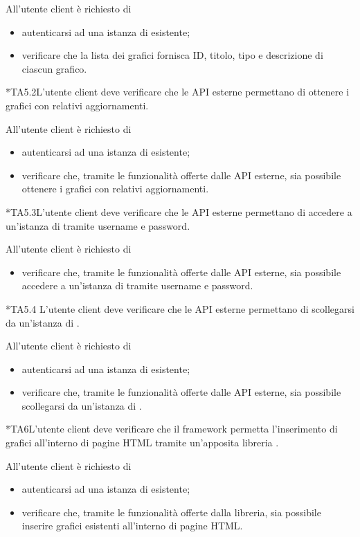 		All'utente client è richiesto di
		\begin{itemize}
			\item autenticarsi ad una istanza di \projectname{} esistente;
			\item verificare che la lista dei grafici fornisca ID, titolo, tipo e descrizione di ciascun grafico.
		\end{itemize}

	*{TA5.2}L'utente client deve verificare che le API esterne permettano di ottenere i grafici con relativi aggiornamenti.
		
		All'utente client è richiesto di
		\begin{itemize}
			\item autenticarsi ad una istanza di \projectname{} esistente;
			\item verificare che, tramite le funzionalità offerte dalle API esterne, sia possibile ottenere i grafici con relativi aggiornamenti.
		\end{itemize}

	*{TA5.3}L'utente client deve verificare che le API esterne permettano di accedere a un'istanza di \projectname{} tramite username e password.
		
		All'utente client è richiesto di
		\begin{itemize}
			\item verificare che, tramite le funzionalità offerte dalle API esterne, sia possibile accedere a un'istanza di \projectname{} tramite username e password.
		\end{itemize}

	*{TA5.4} L'utente client deve verificare che le API esterne permettano di scollegarsi  da un'istanza di \projectname{}.
		
		All'utente client è richiesto di
		\begin{itemize}
			\item autenticarsi ad una istanza di \projectname{} esistente;
			\item verificare che, tramite le funzionalità offerte dalle API esterne, sia possibile scollegarsi da un'istanza di \projectname{}.
		\end{itemize}

	*{TA6}L'utente client deve verificare che il framework permetta l'inserimento di grafici all'interno di pagine HTML tramite un'apposita libreria .
		
		All'utente client è richiesto di
		\begin{itemize}
			\item autenticarsi ad una istanza di \projectname{} esistente;
			\item verificare che, tramite le funzionalità offerte dalla libreria, sia possibile inserire grafici esistenti all'interno di pagine HTML.
		\end{itemize}

